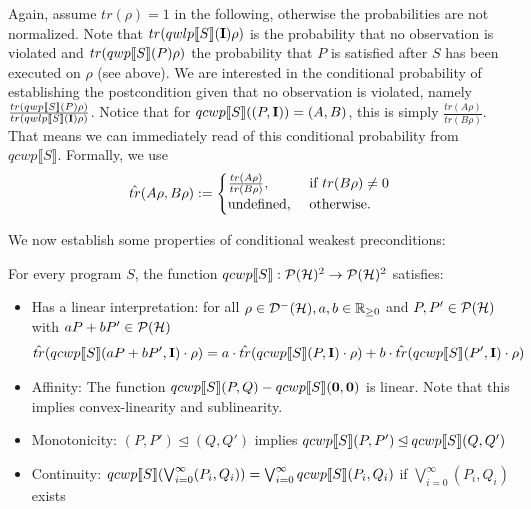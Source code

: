 \documentclass[a4paper,UKenglish,cleveref, autoref, thm-restate]{lipics-v2021}
\begin{document}
Again, assume $tr(\rho)=1$ in the following, otherwise the probabilities are not normalized.
Note that $tr(qwlp\llbracket S \rrbracket (\textbf{I})\rho)$ is the probability that no observation is violated and $tr(qwp\llbracket S \rrbracket (P)\rho)$ the probability that $P$ is satisfied after $S$ has been executed on $\rho$ (see above). We are interested in the conditional probability of establishing the postcondition given that no observation is violated, namely $\frac{tr(qwp\llbracket S \rrbracket (P)\rho)}{tr(qwlp\llbracket S \rrbracket (\textbf{I})\rho)}$. Notice that for $qcwp\llbracket S \rrbracket ((P,\textbf{I}))=(A,B)$, this is simply $\frac{tr(A\rho)}{tr(B\rho)}$. That means we can immediately read of this conditional probability from $qcwp\llbracket S \rrbracket$. Formally, we use \begin{align*}
    \hat{tr}(A\rho,B\rho) := \begin{cases}\frac{tr(A\rho)}{tr(B\rho)}, &\text{ if } tr(B\rho)\neq 0\\
        \text{undefined} ,&\text{ otherwise}.
    \end{cases}
\end{align*}

We now establish some properties of conditional weakest preconditions:
\begin{proposition} \label{prop:healthcwp}
    For every program $S$, the function $qcwp\llbracket S \rrbracket:\mathcal{P}(\mathcal{H})^2 \to \mathcal{P}(\mathcal{H})^2$ satisfies:
    \begin{itemize}
        \item Has a linear interpretation: for all $\rho \in \mathcal{D}^- (\mathcal{H}), a,b \in \mathbb{R}_{\geq 0}$ and $P,P'\in \mathcal{P}(\mathcal{H})$ with $aP+bP' \in \mathcal{P}(\mathcal{H})$
        \begin{align*}
            \hat{tr}(qcwp\llbracket S \rrbracket (aP+bP',\textbf{I}) \cdot \rho) = a \cdot \hat{tr}(qcwp\llbracket S \rrbracket (P,\textbf{I})\cdot \rho) + b\cdot\hat{tr}(qcwp\llbracket S \rrbracket (P',\textbf{I}) \cdot\rho)
        \end{align*}
        \item Affinity: The function $qcwp\llbracket S \rrbracket (P,Q) - qcwp\llbracket S \rrbracket (\mathbf{0},\mathbf{0})$ is linear. Note that this implies convex-linearity and sublinearity.
        \item Monotonicity: $(P,P')\unlhd (Q,Q')$ implies $qcwp\llbracket S \rrbracket (P,P')\unlhd qcwp\llbracket S \rrbracket (Q,Q')$
        \item Continuity: $qcwp\llbracket S \rrbracket (\bigvee_{i=0}^\infty (P_i,Q_i)) = \bigvee_{i=0}^\infty qcwp\llbracket S \rrbracket (P_i,Q_i)$ if $\bigvee_{i=0}^\infty (P_i,Q_i)$ exists
    \end{itemize}
\end{proposition}
\end{document}
